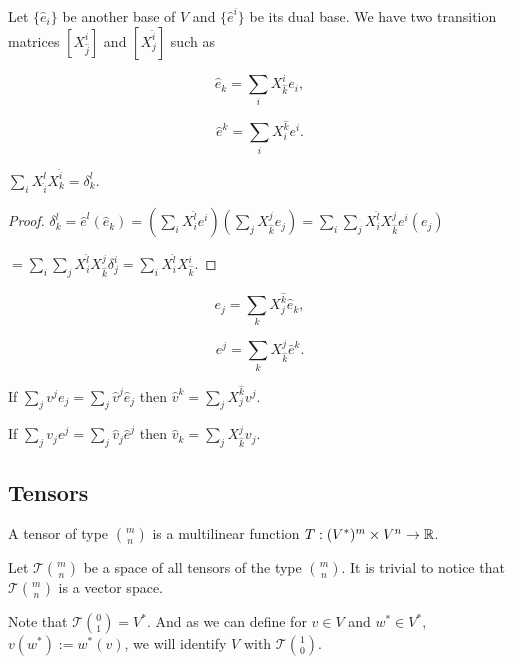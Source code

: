\documentclass[main.tex]{subfiles}
\begin{document}
\noindent
Let $\{\hat{e}_i\}$ be another base of $V$ and $\{\hat{e}^i\}$ be its dual base. We have two transition matrices
$[X^i_{\hat{j}}]$ and $[X^{\hat{i}}_{j}]$ such as

\begin{equation}
\label{con_trans}
\hat{e}_k = \sum_i X^i_{\hat{k}}e_i,
\end{equation}

\begin{equation}
\hat{e}^k = \sum_i X^{\hat{k}}_i e^i.
\end{equation}

\begin{fact}
$\sum_i X^l_{\hat{i}}X^{\hat{i}}_k = \delta^l_k.$
\end{fact}
\begin{proof}
$\delta^l_k = \hat{e}^l(\hat{e}_k) = (\sum_i X^{\hat{l}}_i e^i)(\sum_j X^j_{\hat{k}}e_j) = 
\sum_i\sum_j X^{\hat{l}}_i X^j_{\hat{k}} e^i(e_j)$

$= \sum_i\sum_j X^{\hat{l}}_i X^j_{\hat{k}} \delta^i_j = \sum_i X^{\hat{l}}_i X^i_{\hat{k}}.$
\end{proof}
\begin{corollary}
$$
e_j = \sum_k X^{\hat{k}}_j \hat{e}_k,
$$

$$
e^j = \sum_k X^j_{\hat{k}} \hat{e}^k.
$$
\end{corollary}

\begin{corollary}
If $\sum_j v^j e_j = \sum_j \hat{v}^j \hat{e}_j$ then $\hat{v}^k = \sum_j X^{\hat{k}}_j v^j$.
\end{corollary}

\begin{corollary}
If $\sum_j v_j e^j = \sum_j \hat{v}_j \hat{e}^j$ then $\hat{v}_k = \sum_j X^j_{\hat{k}} v_j$.
\end{corollary}

\subsection{Tensors} 
\begin{definition}
A tensor of type $\binom{m}{n}$ is a multilinear function $T:(V^*)^m \times V^n \to \mathbb{R}$.
\end{definition}

\noindent
Let $\mathcal{T}\binom{m}{n}$ be a space of all tensors of the type $\binom{m}{n}$. It is trivial to notice that $\mathcal{T}\binom{m}{n}$ is a vector space.

Note that $\mathcal{T}\binom{0}{1} = V^*$. And as we can define for $v\in V$ and $w^*\in V^*$, $v(w^*) := w^*(v)$, we will identify $V$ with $\mathcal{T}\binom{1}{0}$.
\end{document}
